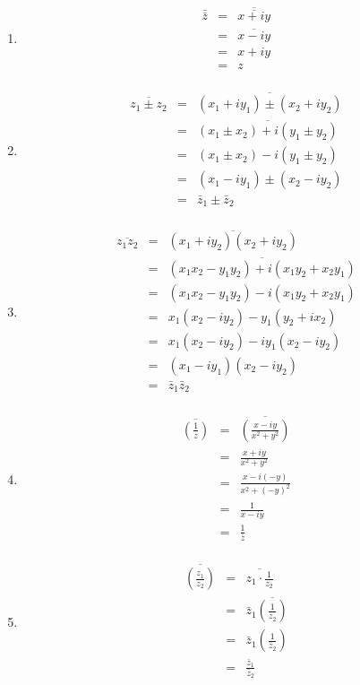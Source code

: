 \documentclass[letterpaper,12pt,fleqn]{article}
\newcommand{\conj}[1]{\bar{#1}}
\newcommand{\Conj}[1]{\overline{#1}}
\begin{document}
\begin{theproof}
\listbreak
\begin{enumerate}
\item
\begin{eqnarray*}
\conj{\conj{z}} &=& \Conj{\Conj{x+iy}} \\
    &=& \Conj{x-iy} \\
    &=& x+iy \\
    &=& z \\
\end{eqnarray*}

\item
\begin{eqnarray*}
\Conj{z_1\pm z_2} &=& \Conj{(x_1+iy_1)\pm(x_2+iy_2)} \\
    &=& \Conj{(x_1\pm x_2)+i(y_1\pm y_2)} \\
    &=& (x_1\pm x_2)-i(y_1\pm y_2) \\
    &=& (x_1-iy_1)\pm(x_2-iy_2) \\
    &=& \conj{z}_1\pm\conj{z}_2 \\
\end{eqnarray*}

\item
\begin{eqnarray*}
\Conj{z_1z_2} &=& \Conj{(x_1+iy_2)(x_2+iy_2)} \\
    &=& \Conj{(x_1x_2-y_1y_2)+i(x_1y_2+x_2y_1)} \\
    &=& (x_1x_2-y_1y_2)-i(x_1y_2+x_2y_1) \\
    &=& x_1(x_2-iy_2)-y_1(y_2+ix_2) \\
    &=& x_1(x_2-iy_2)-iy_1(x_2-iy_2) \\
    &=& (x_1-iy_1)(x_2-iy_2) \\
    &=& \conj{z}_1\conj{z}_2 \\
\end{eqnarray*}

\item
\begin{eqnarray*}
\Conj{\left(\frac{1}{z}\right)} &=& \Conj{\left(\frac{x-iy}{x^2+y^2}\right)} \\
    &=& \frac{x+iy}{x^2+y^2} \\
    &=& \frac{x-i(-y)}{x^2+(-y)^2} \\
    &=& \frac{1}{x-iy} \\
    &=& \frac{1}{\conj{z}} \\
\end{eqnarray*}

\item
\begin{eqnarray*}
\Conj{\left(\frac{z_1}{z_2}\right)} &=& \Conj{z_1\cdot\frac{1}{z_2}} \\
    &=& \conj{z}_1\Conj{\left(\frac{1}{z_2}\right)} \\
    &=& \conj{z}_1\left(\frac{1}{\conj{z}_2}\right) \\
    &=& \frac{\conj{z}_1}{\conj{z}_2} \\
\end{eqnarray*}
\end{enumerate}
\end{theproof}
\end{document}
